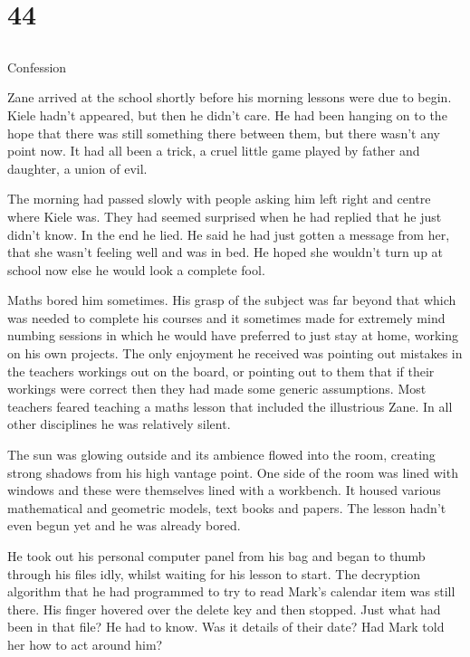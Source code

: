 \chapter{44}
\section{}
Confession  

Zane arrived at the school shortly before his morning lessons were due to begin.  Kiele hadn't appeared, but then he didn't care.  He had been hanging on to the hope that there was still something there between them, but there wasn't any point now.  It had all been a trick, a cruel little game played by father and daughter, a union of evil.

The morning had passed slowly with people asking him left right and centre where Kiele was.  They had seemed surprised when he had replied that he just didn't know.  In the end he lied.  He said he had just gotten a message from her, that she wasn't feeling well and was in bed.  He hoped she wouldn't turn up at school now else he would look a complete fool.

Maths bored him sometimes.  His grasp of the subject was far beyond that which was needed to complete his courses and it sometimes made for extremely mind numbing sessions in which he would have preferred to just stay at home, working on his own projects.  The only enjoyment he received was pointing out mistakes in the teachers workings out on the board, or pointing out to them that if their workings were correct then they had made some generic assumptions.  Most teachers feared teaching a maths lesson that included the illustrious Zane.  In all other disciplines he was relatively silent.

The sun was glowing outside and its ambience flowed into the room, creating strong shadows from his high vantage point.  One side of the room was lined with windows and these were themselves lined with a workbench.  It housed various mathematical and geometric models, text books and papers.  The lesson hadn't even begun yet and he was already bored.

He took out his personal computer panel from his bag and began to thumb through his files idly, whilst waiting for his lesson to start.  The decryption algorithm that he had programmed to try to read Mark's calendar item was still there.  His finger hovered over the delete key and then stopped.  Just what had been in that file?  He had to know.  Was it details of their date?  Had Mark told her how to act around him?

